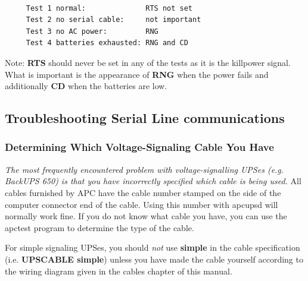 {{{{{{{{{{\footnotesize
\begin{verbatim}
     
     Test 1 normal:              RTS not set
     Test 2 no serial cable:     not important
     Test 3 no AC power:         RNG
     Test 4 batteries exhausted: RNG and CD
\end{verbatim}
\normalsize

Note: {\bf RTS} should never be set in any of the tests as it is the killpower
signal. What is important is the appearance of {\bf RNG} when the power fails
and additionally {\bf CD} when the batteries are low. 

\label{Troubleshooting-Serial-Line-communications}

\subsection*{Troubleshooting Serial Line communications}

\label{index-Problems_002c-Serial-228}
\label{index-Serial-Problems-229}

\label{Determining-Which-Voltage_002dSignaling-Cable-You-Have}

\subsubsection*{Determining Which Voltage-Signaling Cable You Have}

{\it The most frequently encountered problem with voltage-signalling UPSes
(e.g. BackUPS 650) is that you have incorrectly specified which cable is being
used.} All cables furnished by APC have the cable number stamped on the side
of the computer connector end of the cable. Using this number with apcupsd
will normally work fine. If you do not know what cable you have, you can use
the apctest program to determine the type of the cable.  

For simple signaling UPSes, you should {\it not} use {\bf simple} in the cable
specification (i.e. {\bf UPSCABLE simple}) unless you have made the cable
yourself according to the wiring diagram given in the cables chapter of this
manual. 

}}}}}}}}}}
